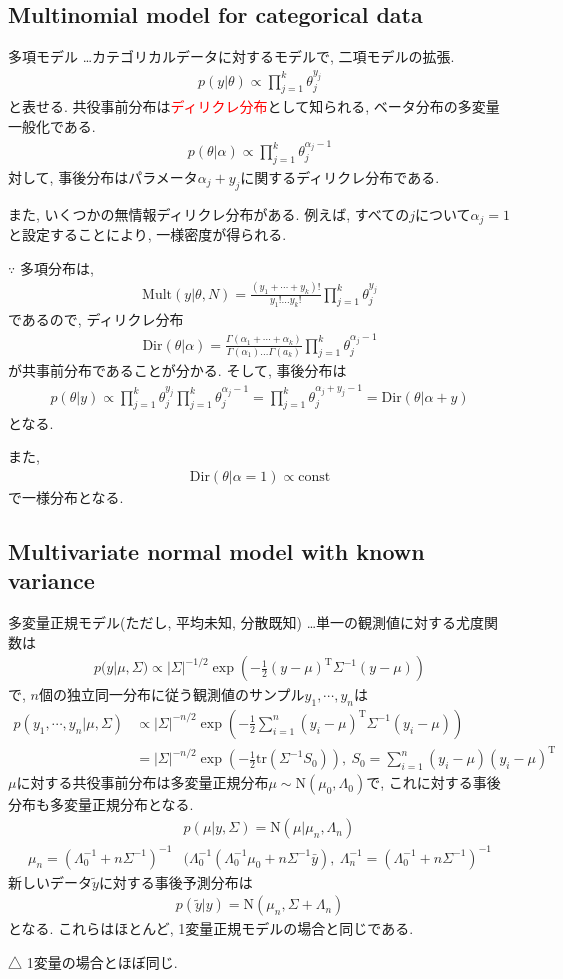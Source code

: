 \documentclass[11pt,a4pape,dvipdfmx]{jarticle}
\newcommand{\eqn}[1]{\begin{align*}#1\end{align*}}
\newcommand{\tcr}[1]{\textcolor{red}{#1}}
\begin{document}

\subsection{Multinomial model for categorical data}
\begin{itembox}[l]{多項モデル}
…カテゴリカルデータに対するモデルで, 二項モデルの拡張.
\eqn{p(y|\theta)\propto\prod_{j=1}^k \theta_j^{y_j}}
と表せる.
共役事前分布は\tcr{ディリクレ分布}として知られる, ベータ分布の多変量一般化である.
\eqn{p(\theta|\alpha)\propto \prod_{j=1}^k\theta_j^{\alpha_j-1}}
対して, 事後分布はパラメータ$\alpha_j+y_j$に関するディリクレ分布である.

また, いくつかの無情報ディリクレ分布がある.
例えば, すべての$j$について$\alpha_j= 1$と設定することにより, 一様密度が得られる.
\end{itembox}
$\because$
多項分布は,
\eqn{\text{Mult}(y|\theta,N)=\frac{(y_1+\cdots+y_k) !}{y_1 ! \dots y_k!}\prod_{j=1}^k \theta_{j}^{y_j}}
であるので,
ディリクレ分布
\eqn{\text{Dir}(\theta|\alpha)=\frac{\Gamma(\alpha_1+\cdots+\alpha_k)}{\Gamma(\alpha_1) \dots \Gamma(a_k)} \prod_{j=1}^k \theta_j^{\alpha_j-1}}
が共事前分布であることが分かる.
そして, 事後分布は
\eqn{p(\theta|y)\propto \prod_{j=1}^k \theta_{j}^{y_j} \prod_{j=1}^k \theta_j^{\alpha_j-1}
=\prod_{j=1}^k \theta_{j}^{\alpha_j+y_j-1}=\text{Dir}(\theta|\alpha+y)}
となる.

また,
\eqn{\text{Dir}(\theta|\alpha=1)\propto \text{const}}
で一様分布となる.


\subsection{Multivariate normal model with known variance}

\begin{itembox}[l]{多変量正規モデル(ただし, 平均未知, 分散既知)}
…単一の観測値に対する尤度関数は
\eqn{p(y|\mu,\Sigma)\propto |\Sigma|^{-1/2}\exp \left(-\tfrac{1}{2}(y-\mu)^{\mathrm{T}}\Sigma^{-1}(y-\mu)\right)}
で, $n$個の独立同一分布に従う観測値のサンプル$y_1,\cdots,y_n$は
\eqn{p(y_1,\cdots,y_n|\mu,\Sigma)&\propto|\Sigma|^{-n/2} \exp\left(-\frac{1}{2}\sum_{i=1}^n(y_i-\mu)^{\mathrm{T}}\Sigma^{-1}(y_i-\mu)\right)\nonumber\\
&=|\Sigma|^{-n/2}\exp \left(-\tfrac{1}{2}\text{tr}(\Sigma^{-1}S_0)\right),\ S_0=\sum_{i=1}^n(y_i-\mu)(y_i-\mu)^{\mathrm{T}}}
$\mu$に対する共役事前分布は多変量正規分布$\mu \sim \text{N}(\mu_0,\Lambda_0)$で, これに対する事後分布も多変量正規分布となる.
\eqn{&p(\mu|y,\Sigma)=\text{N}(\mu|\mu_n,\Lambda_n)\\
\mu_n=(\Lambda_0^{-1}+n\Sigma^{-1})^{-1}&(\Lambda_0^{-1}(\Lambda_0^{-1}\mu_0+n\Sigma^{-1}\bar{y}),\ \Lambda^{-1}_n=(\Lambda_0^{-1}+n\Sigma^{-1})^{-1}}
新しいデータ$\tilde{y}$に対する事後予測分布は
\eqn{p(\tilde{y}|y)=\text{N}(\mu_n,\Sigma+\Lambda_n)}
となる.
これらはほとんど, 1変量正規モデルの場合と同じである.
\end{itembox}
△
1変量の場合とほぼ同じ.
\end{document}
